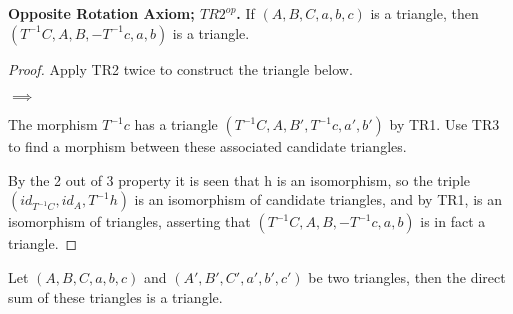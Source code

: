     \begin{lemma} \textbf{Opposite Rotation Axiom; $TR2^{op}$.}
        If $(A,B,C,a,b,c)$ is a triangle, then $(T^{-1}C,A,B,-T^{-1}c,a,b)$ is a triangle.
    \end{lemma}

    \begin{proof}
        Apply TR2 twice to construct the triangle below.
        \begin{center}
            $\implies$
        \end{center}
        The morphism $T^{-1}c$ has a triangle $(T^{-1}C,A,B',T^{-1}c,a',b')$ by TR1. Use TR3 to find a morphism between these associated candidate triangles.
        \begin{center}
        \end{center}
        By the 2 out of 3 property it is seen that h is an isomorphism, so the triple $(id_{T^{-1}C}, id_A, T^{-1}h)$ is an isomorphism of candidate triangles, and by TR1, is an isomorphism of triangles, asserting that $(T^{-1}C,A,B,-T^{-1}c,a,b)$ is in fact a triangle.
    \end{proof}

    \begin{lemma}
        Let $(A,B,C,a,b,c)$ and $(A',B',C',a',b',c')$ be two triangles, then the direct sum of these triangles is a triangle.
    \end{lemma}

